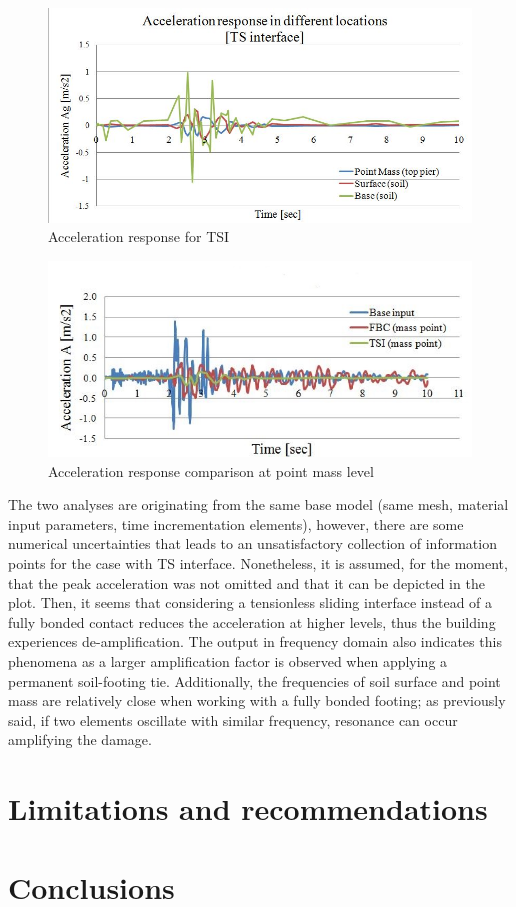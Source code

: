 \begin{figure}[!h]
	\centering
	\includegraphics[width=0.7\linewidth]{"acc_TSI"}
	\caption{Acceleration response for TSI}
	\label{TSIacc}
\end{figure}

\begin{figure}[!h]
	\centering
	\includegraphics[width=0.7\linewidth]{"acc_FBC"}
	\caption{Acceleration response comparison at point mass level}
	\label{FBCacc}
\end{figure}

The two analyses are originating from the same base model (same mesh, material input parameters, time incrementation elements), however, there are some numerical uncertainties that leads to an unsatisfactory collection of information points for the case with TS interface. Nonetheless, it is assumed, for the moment, that the peak acceleration was not omitted and that it can be depicted in the plot. Then, it seems that considering a tensionless sliding interface instead of a fully bonded contact reduces the acceleration at higher levels, thus the building experiences de-amplification. The output in frequency domain also indicates this phenomena as a larger amplification factor is observed when applying a permanent soil-footing tie. Additionally, the frequencies of soil surface and point mass are relatively close when working with a fully bonded footing; as previously said, if two elements oscillate with similar frequency, resonance can occur amplifying the damage. 


\section{Limitations and recommendations}


\section{Conclusions}

